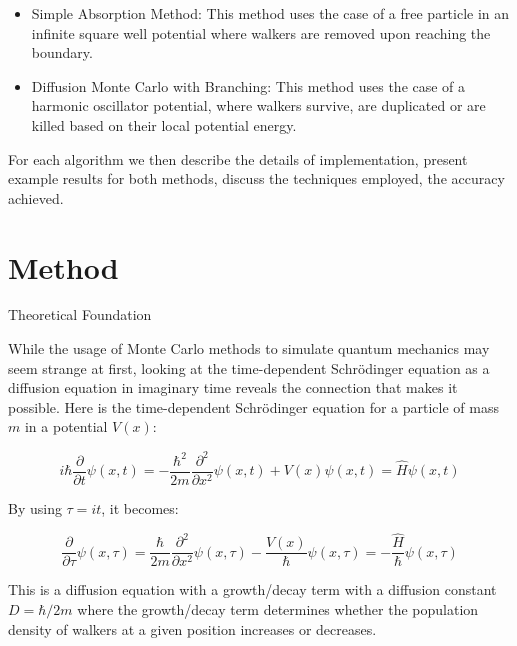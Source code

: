 \documentclass[reqno]{amsart}
\makeatletter
\renewcommand\subsection{\@startsection{subsection}{2}%
  \z@{.5\linespacing\@plus.7\linespacing}{-.5em}%
  {\normalfont\scshape\justify}}
\numberwithin{equation}{section}
\numberwithin{figure}{section}
\makeatother
\begin{document}
\begin{itemize}
    \item Simple Absorption Method:
        This method uses the case of a free particle in an infinite square well potential where walkers are removed upon reaching the boundary.
    \item Diffusion Monte Carlo with Branching:
        This method uses the case of a harmonic oscillator potential, where walkers survive, are duplicated or are killed based on their local potential energy.
\end{itemize}

For each algorithm we then describe the details of implementation, present example results for both methods, discuss the techniques employed, the accuracy achieved.

\section{Method}
\subsection{Theoretical Foundation}

While the usage of Monte Carlo methods to simulate quantum mechanics may seem strange at first, looking at the time-dependent Schrödinger equation as a diffusion equation in imaginary time reveals the connection that makes it possible. Here is the time-dependent Schrödinger equation for a particle of mass $m$ in a potential $V(x)$:

\begin{equation}
    i\hbar\frac{\partial}{\partial t}\psi(x,t) = -\frac{\hbar^2}{2m}\frac{\partial^2}{\partial x^2}\psi(x,t) + V(x)\psi(x,t) = \hat{H}\psi(x,t)
\end{equation}

By using $\tau = it$, it becomes:

\begin{equation}
    \frac{\partial}{\partial \tau}\psi(x,\tau) = \frac{\hbar}{2m}\frac{\partial^2}{\partial x^2}\psi(x,\tau) - \frac{V(x)}{\hbar}\psi(x,\tau) = -\frac{\hat{H}}{\hbar}\psi(x,\tau)
    \label{eq:diffusion}
\end{equation}

This is a diffusion equation with a growth/decay term with a diffusion constant $D = \hbar/2m$ where the growth/decay term determines whether the population density of walkers at a given position increases or decreases. \\
\end{document}
